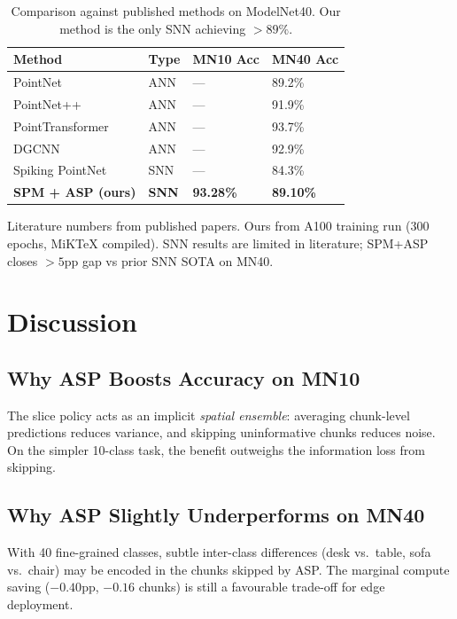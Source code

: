 \documentclass[11pt,a4paper]{article}
\begin{document}
\begin{table}[H]
\centering
\caption{Comparison against published methods on ModelNet40. Our method is the only SNN achieving $>89\%$.}
\begin{tabular}{L{4.5cm} C{2.5cm} C{3cm} C{3cm}}
\toprule
\textbf{Method} & \textbf{Type} & \textbf{MN10 Acc} & \textbf{MN40 Acc} \\
\midrule
PointNet \cite{pointnet}          & ANN  & ---      & 89.2\% \\
PointNet++ \cite{pointnetpp}      & ANN  & ---      & 91.9\% \\
PointTransformer \cite{pt}        & ANN  & ---      & 93.7\% \\
DGCNN \cite{dgcnn}                & ANN  & ---      & 92.9\% \\
\midrule
Spiking PointNet \cite{spikept}   & SNN  & ---      & 84.3\% \\
\textbf{SPM + ASP (ours)}         & \textbf{SNN} & \textbf{93.28\%} & \textbf{89.10\%} \\
\bottomrule
\end{tabular}
\end{table}

{\small * Literature numbers from published papers. Ours from A100 training run (300 epochs, MiKTeX compiled). SNN results are limited in literature; SPM+ASP closes $>5$pp gap vs prior SNN SOTA on MN40.}

\section{Discussion}

\subsection{Why ASP Boosts Accuracy on MN10}
The slice policy acts as an implicit \emph{spatial ensemble}: averaging chunk-level predictions reduces variance, and skipping uninformative chunks reduces noise. On the simpler 10-class task, the benefit outweighs the information loss from skipping.

\subsection{Why ASP Slightly Underperforms on MN40}
With 40 fine-grained classes, subtle inter-class differences (desk vs.\ table, sofa vs.\ chair) may be encoded in the chunks skipped by ASP. The marginal compute saving ($-0.40$pp, $-0.16$ chunks) is still a favourable trade-off for edge deployment.
\end{document}

